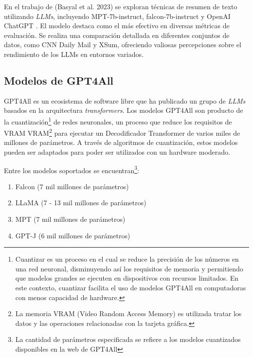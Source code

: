     En el trabajo de (Basyal et al. 2023)\cite{basyal2023text} se exploran técnicas de resumen de texto utilizando \emph{LLMs}, incluyendo MPT-7b-instruct\cite{mpt}, falcon-7b-instruct\cite{falcon} y OpenAI ChatGPT \cite{brown2020language}. El modelo  destaca como el más efectivo en diversas métricas de evaluación. Se realiza una comparación detallada en diferentes conjuntos de datos, como CNN Daily Mail y XSum, ofreciendo valiosas percepciones sobre el rendimiento de los LLMs en entornos variados. 

    \subsection{Modelos de GPT4All}

        GPT4All es un ecosistema de software libre que ha publicado un grupo de \emph{LLMs} basados en la arquitectura \emph{transformers}\cite{attention}. Los modelos GPT4All son producto de la cuantización\footnote{Cuantizar es un proceso en el cual se reduce la precisión de los números en una red neuronal, disminuyendo así los requisitos de memoria y permitiendo que modelos grandes se ejecuten en dispositivos con recursos limitados. En este contexto, cuantizar facilita el uso de modelos GPT4All en computadoras con menos capacidad de hardware.} de redes neuronales, un proceso que reduce los requisitos de VRAM VRAM\footnote{La memoria VRAM (Video Random Access Memory) es utilizada tratar los datos y las operaciones relacionadas con la tarjeta gráfica.} para ejecutar un Decodificador Transformer de varios miles de millones de parámetros. A través de algoritmos de cuantización, estos modelos pueden ser adaptados para poder ser utilizados con un hardware moderado\cite{webgpt4all}.
        
        Entre los modelos soportados se encuentran\footnote{La cantidad de parámetros especificada se refiere a los modelos cuantizados disponibles en la web de GPT4All}:

        \begin{enumerate}
            \item Falcon (7 mil millones de parámetros)~\cite{falcon}
            \item LLaMA (7 - 13 mil millones de parámetros)~\cite{llama}
            \item MPT (7 mil millones de parámetros)~\cite{mpt}
            \item GPT-J (6 mil millones de parámetros)~\cite{gptj}
        \end{enumerate}

